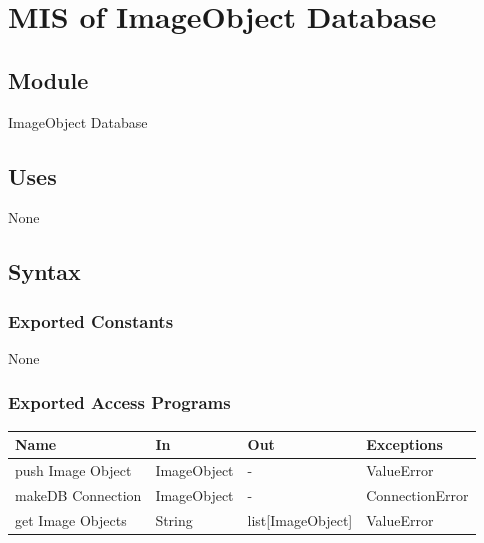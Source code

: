 \documentclass[12pt, titlepage]{article}
\begin{document}
\newpage


\section{MIS of ImageObject Database }\label{ImageObject database}
  
  
  
  \subsection{Module}
  
  ImageObject Database
  
  \subsection{Uses}
  
  None
  
  \subsection{Syntax}


  
  \subsubsection{Exported Constants}
  None
  \subsubsection{Exported Access Programs}
  
  \begin{center}
  \begin{tabular}{p{2cm} p{4cm} p{4cm} p{2cm}}
  \hline
  \textbf{Name} & \textbf{In} & \textbf{Out} & \textbf{Exceptions} \\
  \hline
  push Image Object & ImageObject & - & ValueError \\
  \hline
  makeDB Connection & ImageObject & - &  ConnectionError\\
  \hline
  get Image Objects & String & list[ImageObject] & ValueError \\
  \hline
  \end{tabular}
  \end{center}
  
\end{document}
